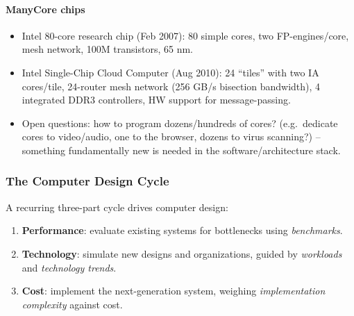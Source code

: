 \paragraph{ManyCore chips}
\begin{itemize}
  \item Intel 80-core research chip (Feb 2007): 80 simple cores, two
  FP-engines/core, mesh network, 100M transistors, 65 nm.
  \item Intel Single-Chip Cloud Computer (Aug 2010): 24 ``tiles'' with two
  IA cores/tile, 24-router mesh network (256 GB/s bisection bandwidth), 4
  integrated DDR3 controllers, HW support for message-passing.
  \item Open questions: how to program dozens/hundreds of cores? (e.g.\
  dedicate cores to video/audio, one to the browser, dozens to virus
  scanning?) -- something fundamentally new is needed in the
  software/architecture stack.
\end{itemize}

\subsubsection{The Computer Design Cycle}
\label{sec:computer-design-cycle}

A recurring three-part cycle drives computer design:

\begin{enumerate}
  \item \textbf{Performance}: evaluate existing systems for bottlenecks
  using \emph{benchmarks}.
  \item \textbf{Technology}: simulate new designs and organizations, guided
  by \emph{workloads} and \emph{technology trends}.
  \item \textbf{Cost}: implement the next-generation system, weighing
  \emph{implementation complexity} against cost.
\end{enumerate}

